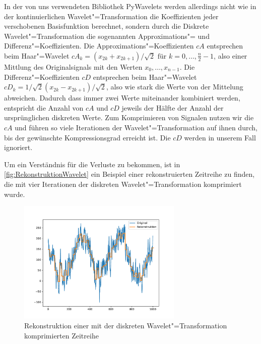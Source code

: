 In der von uns verwendeten Bibliothek PyWavelets \cite{pyWavelets} werden allerdings nicht wie in der kontinuierlichen Wavelet"=Transformation die Koeffizienten jeder verschobenen Basisfunktion berechnet, sondern durch die Diskrete Wavelet"=Transformation die sogenannten Approximations"= und Differenz"=Koeffizienten. Die Approximations"=Koeffizienten $cA$ entsprechen beim Haar"=Wavelet $cA_k = (x_{2k} + x_{2k+1})/\sqrt{2} \text{ für } k=0,\ldots,\frac{n}{2}-1$, also einer Mittlung des Originalsignals mit den Werten $x_0,\ldots,x_{n-1}$. Die Differenz"=Koeffizienten $cD$ entsprechen beim Haar"=Wavelet $cD_k = 1/\sqrt{2}(x_{2k}-x_{2k+1})/\sqrt{2}$, also wie stark die Werte von der Mittelung abweichen. Dadurch dass immer zwei Werte miteinander kombiniert werden, entspricht die Anzahl von $cA$ und $cD$ jeweils der Hälfte der Anzahl der ursprünglichen diskreten Werte. Zum Komprimieren von Signalen nutzen wir die $cA$ und führen so viele Iterationen der Wavelet"=Transformation auf ihnen durch, bis der gewünschte Kompressionsgrad erreicht ist. Die $cD$ werden in unserem Fall ignoriert.

Um ein Verständnis für die Verluste zu bekommen, ist in \autoref{fig:RekonstruktionWavelet} ein Beispiel einer rekonstruierten Zeitreihe zu finden, die mit vier Iterationen der diskreten Wavelet"=Transformation komprimiert wurde.
\begin{figure}[bth] 
  \centering
  \includegraphics[width=0.7\textwidth]{Graphics/RekonstruktionWavelet.pdf}
  \caption{Rekonstruktion einer mit der diskreten Wavelet"=Transformation komprimierten Zeitreihe}
  \label{fig:RekonstruktionWavelet}
\end{figure}